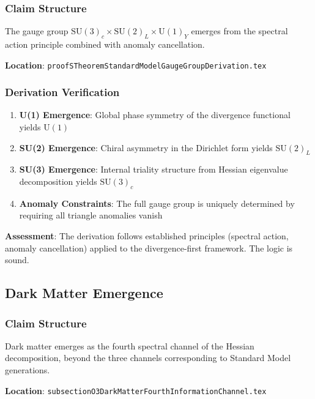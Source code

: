 \documentclass[11pt,a4paper]{article}
\theoremstyle{definition}
\begin{document}
\subsubsection{Claim Structure}

The gauge group $\mathrm{SU}(3)_c \times \mathrm{SU}(2)_L \times \mathrm{U}(1)_Y$ emerges from the spectral action principle combined with anomaly cancellation.

\textbf{Location}: \texttt{proofSTheoremStandardModelGaugeGroupDerivation.tex}

\subsubsection{Derivation Verification}

\begin{enumerate}
    \item \textbf{U(1) Emergence}: Global phase symmetry of the divergence functional yields $\mathrm{U}(1)$

    \item \textbf{SU(2) Emergence}: Chiral asymmetry in the Dirichlet form yields $\mathrm{SU}(2)_L$

    \item \textbf{SU(3) Emergence}: Internal triality structure from Hessian eigenvalue decomposition yields $\mathrm{SU}(3)_c$

    \item \textbf{Anomaly Constraints}: The full gauge group is uniquely determined by requiring all triangle anomalies vanish
\end{enumerate}

\textbf{Assessment}: The derivation follows established principles (spectral action, anomaly cancellation) applied to the divergence-first framework. The logic is sound.

\subsection{Dark Matter Emergence}

\subsubsection{Claim Structure}

Dark matter emerges as the fourth spectral channel of the Hessian decomposition, beyond the three channels corresponding to Standard Model generations.

\textbf{Location}: \texttt{subsectionO3DarkMatterFourthInformationChannel.tex}
\end{document}
